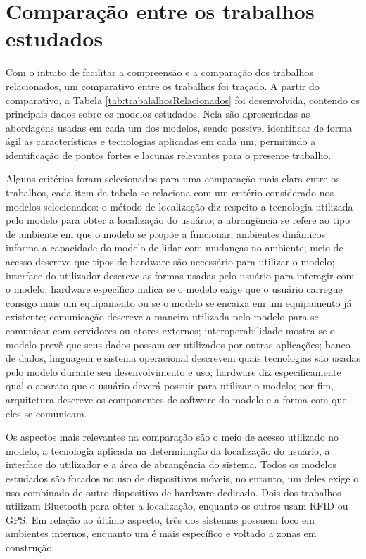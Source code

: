 \documentclass[english,brazilian]{UNISINOSmonografia}
\begin{document}
	\section{Comparação entre os trabalhos estudados}\label{comparacaoTrabs}

Com o intuito de facilitar a compreensão e a comparação dos trabalhos relacionados, um comparativo entre os trabalhos foi traçado. A partir do comparativo, a Tabela \ref{tab:trabalalhosRelacionados} foi desenvolvida, contendo os principais dados sobre os modelos estudados. Nela são apresentadas as abordagens usadas em cada um dos modelos, sendo possível identificar de forma ágil as características e tecnologias aplicadas em cada um, permitindo a identificação de pontos fortes e lacunas relevantes para o presente trabalho. 

Alguns critérios foram selecionados para uma comparação mais clara entre os trabalhos, cada item da tabela se relaciona com um critério considerado nos modelos selecionados: o método de localização diz respeito a tecnologia utilizada pelo modelo para obter a localização do usuário; a abrangência se refere ao tipo de ambiente em que o modelo se propõe a funcionar; ambientes dinâmicos informa a capacidade do modelo de lidar com mudanças no ambiente; meio de acesso descreve que tipos de hardware são necessário para utilizar o modelo; interface do utilizador descreve as formas usadas pelo usuário para interagir com o modelo; hardware específico indica se o modelo exige que o usuário carregue consigo mais um equipamento ou se o modelo se encaixa em um equipamento já existente; comunicação descreve a maneira utilizada pelo modelo para se comunicar com servidores ou atores externos; interoperabilidade mostra se o modelo prevê que seus dados possam ser utilizados por outras aplicações; banco de dados, linguagem e sistema operacional descrevem quais tecnologias são usadas pelo modelo durante seu desenvolvimento e uso; hardware diz especificamente qual o aparato que o usuário deverá possuir para utilizar o modelo; por fim, arquitetura descreve os componentes de software do modelo e a forma com que eles se comunicam.

Os aspectos mais relevantes na comparação são o meio de acesso utilizado no modelo, a tecnologia aplicada na determinação da localização do usuário, a interface do utilizador e a área de abrangência do sistema. Todos os modelos estudados são focados no uso de dispositivos móveis, no entanto, um deles exige o uso combinado de outro dispositivo de hardware dedicado. Dois dos trabalhos utilizam Bluetooth para obter a localização, enquanto os outros usam RFID ou GPS. Em relação ao último aspecto, três dos sistemas possuem foco em ambientes internos, enquanto um é mais específico e voltado a zonas em construção.
\end{document}
